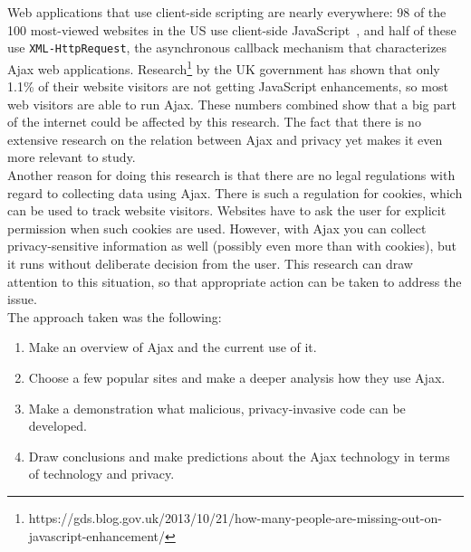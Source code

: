 Web applications that use client-side scripting are nearly everywhere: 98 of the 100 most-viewed websites in the US use client-side JavaScript~\cite{intrusion}, and half of these use \verb|XML-HttpRequest|, the asynchronous callback mechanism that characterizes Ajax web applications. Research\footnote{https://gds.blog.gov.uk/2013/10/21/how-many-people-are-missing-out-on-javascript-enhancement/} by the UK government has shown that only 1.1\% of their website visitors are not getting JavaScript enhancements, so most web visitors are able to run Ajax. These numbers combined show that a big part of the internet could be affected by this research. The fact that there is no extensive research on the relation between Ajax and privacy yet makes it even more relevant to study.\\
	Another reason for doing this research is that there are no legal regulations with regard to collecting data using Ajax. There is such a regulation for cookies, which can be used to track website visitors. Websites have to ask the user for explicit permission when such cookies are used. However, with Ajax you can collect privacy-sensitive information as well (possibly even more than with cookies), but it runs without deliberate decision from the user. This research can draw attention to this situation, so that appropriate action can be taken to address the issue.\\
	
The approach taken was the following:\\
\begin{enumerate}
	\item Make an overview of Ajax and the current use of it.
	\item Choose a few popular sites and make a deeper analysis how they use Ajax.
	\item Make a demonstration what malicious, privacy-invasive code can be developed.
	\item Draw conclusions and make predictions about the Ajax technology in terms of technology and privacy.
\end{enumerate}